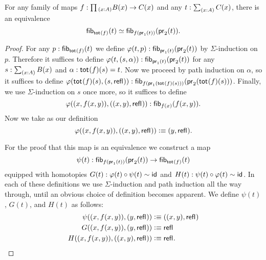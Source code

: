 \begin{lem}\label{lem:fib_total}
  For any family of maps $f:\prd{x:A}B(x)\to C(x)$ and any $t:\sm{x:A}C(x)$,
  there is an equivalence
  \begin{equation*}
    \eqv{\fib{\tot{f}}{t}}{\fib{f(\proj 1(t))}{\proj 2(t)}}.
  \end{equation*}
\end{lem}

\begin{proof}
  For any $p:\mathsf{fib}_{\mathsf{tot}_{}(f)}(t)$ we define $\varphi(t,p):\mathsf{fib}_{\mathsf{pr}_{1}(t)}(\mathsf{pr}_{2}(t))$ by $\Sigma$-induction on $p$. Therefore it suffices to define $\varphi(t,(s,\alpha)):\mathsf{fib}_{\mathsf{pr}_{1}(t)}(\mathsf{pr}_{2} (t))$ for any $s:\sm{x:A}B(x)$ and $\alpha:\mathsf{tot}_{}(f)(s)=t$. Now we proceed by path induction on $\alpha$, so it suffices to define $\varphi(\mathsf{tot}_{}(f)(s),(s,\mathsf{refl}_{})):\mathsf{fib}_{f(\mathsf{pr}_{1}(\mathsf{tot}_{}(f)(s)))}(\mathsf{pr}_{2}(\mathsf{tot}_{}(f)(s)))$. Finally, we use $\Sigma$-induction on $s$ once more, so it suffices to define
  \begin{equation*}
    \varphi((x,f(x,y)),((x,y),\mathsf{refl}_{})):\mathsf{fib}_{f(x)}(f(x,y)).
  \end{equation*}
  Now we take as our definition
  \begin{equation*}
    \varphi((x,f(x,y)),((x,y),\mathsf{refl}_{}))\vcentcolon\equiv(y,\mathsf{refl}_{}).
  \end{equation*}

  For the proof that this map is an equivalence we construct a map
  \begin{equation*}
    \psi(t) : \mathsf{fib}_{f(\mathsf{pr}_{1}(t))}(\mathsf{pr}_{2}(t))\to\mathsf{fib}_{\mathsf{tot}_{}(f)}(t)
  \end{equation*}
  equipped with homotopies $G(t):\varphi(t)\circ\psi(t)\sim\mathsf{id}_{}$ and $H(t):\psi(t)\circ\varphi(t)\sim\mathsf{id}_{}$. In each of these definitions we use $\Sigma$-induction and path induction all the way through, until an obvious choice of definition becomes apparent. We define $\psi(t)$, $G(t)$, and $H(t)$ as follows:
  \begin{align*}
    \psi((x,f(x,y)),(y,\mathsf{refl}_{})) & \vcentcolon\equiv ((x,y),\mathsf{refl}_{}) \\
    G((x,f(x,y)),(y,\mathsf{refl}_{})) & \vcentcolon\equiv \mathsf{refl}_{} \\
    H((x,f(x,y)),((x,y),\mathsf{refl}_{})) & \vcentcolon\equiv \mathsf{refl}_{}.\qedhere
  \end{align*}
\end{proof}

